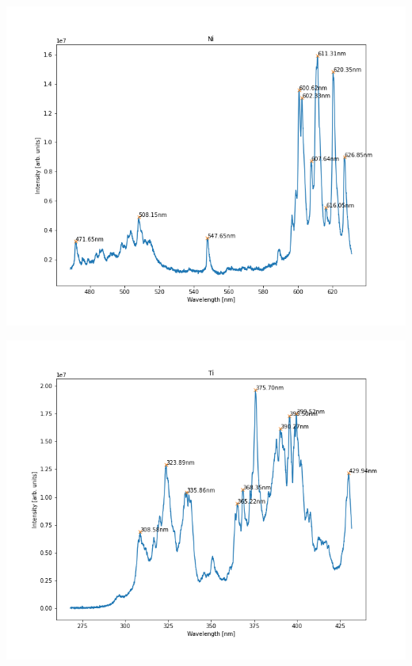 \documentclass{beamer}
\begin{document}
\begin{frame}
    \includegraphics[scale=0.45]{Ni/Ni_550.png}
\end{frame}

\begin{frame}
    \includegraphics[scale=0.45]{Ti/Ti_350.png}
\end{frame}
\end{document}
